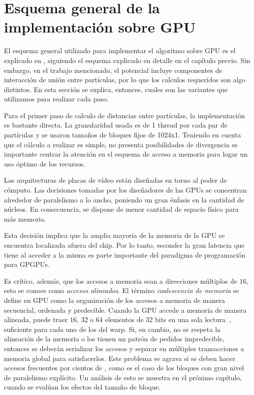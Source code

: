 \section{Esquema general de la implementación sobre GPU}
El esquema general utilizado para implementar el algoritmo sobre GPU es el explicado en \cite{friedrichs2009accelerating}, siguiendo el esquema explicado en detalle en el capítulo previo. 
Sin embargo, en el trabajo mencionado, el potencial incluye componentes de interacción de unión entre partículas, por lo que los calculos requeridos son algo distintos. 
En esta sección se explica, entonces, cuales son las variantes que utilizamos para realizar cada paso.

Para el primer paso de calculo de distancias entre partículas, la implementación es bastante directa. La granularidad usada es de 1 thread por cada par de partículas y se usaron tamaños de bloques fijos de 1024x1.
Teniendo en cuenta que el cálculo a realizar es  simple, no presenta posibilidades de divergencia es importante centrar la atención en el esquema de acceso a memoria para logar un uso óptimo de los recursos.

Las arquitecturas de placas de v\'ideo est\'an dise\~nadas en torno al poder de c\'omputo.
Las decisiones tomadas por los dise\~nadores de las GPUs se concentran alrededor de paralelismo a lo ancho, poniendo un gran \'enfasis en la cantidad de n\'ucleos.
En consecuencia, se dispone de menor cantidad de espacio f\'isico para m\'as memoria.

Esta decisi\'on implica que la amplia mayor\'ia de la memoria de la GPU se encuentra localizada afuera del chip.
Por lo tanto, esconder la gran latencia que tiene al acceder a la misma es parte importante del paradigma de programaci\'on para GPGPUs.

Es cr\'itico, adem\'as, que los accesos a memoria sean a direcciones m\'ultiplos de $16$, esto se conoce como \textit{accesos alineados}.
El t\'ermino \emph{coalescencia de memoria} se define en GPU como la organizaci\'on de los accesos a memoria de manera secuencial, ordenada y predecible.
Cuando la GPU accede a memoria de manera alineada, puede traer $16$, $32$ o $64$ elementos de 32 bits en una sola lectura~\cite{cudaProgrammingGuide}, suficiente para cada uno de los \threads{} del warp.
Si, en cambio, no se respeta la alineaci\'on de la memoria o los \threads{} tienen un patr\'on de pedidos impredecible, entonces se deber\'an serializar los accesos y separar en m\'ultiples transacciones a memoria global para satisfacerlos.
Este problema se agrava si se deben hacer accesos frecuentes por cientos de \threads{}, como es el caso de los bloques con gran nivel de paralelismo expl\'icito.
Un análisis de esto se muestra en el próximo capítulo, cuando se evalúan los efectos del tamaño de bloque.


